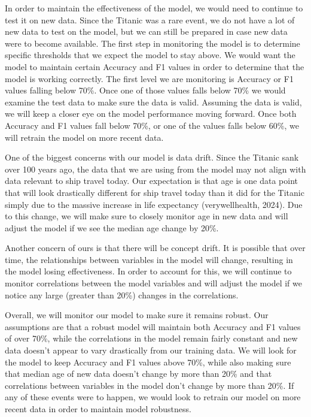 \documentclass[
  letterpaper,
  DIV=11,
  numbers=noendperiod]{scrartcl}
\begin{document}
In order to maintain the effectiveness of the model, we would need to
continue to test it on new data. Since the Titanic was a rare event, we
do not have a lot of new data to test on the model, but we can still be
prepared in case new data were to become available. The first step in
monitoring the model is to determine specific thresholds that we expect
the model to stay above. We would want the model to maintain certain
Accuracy and F1 values in order to determine that the model is working
correctly. The first level we are monitoring is Accuracy or F1 values
falling below 70\%. Once one of those values falls below 70\% we would
examine the test data to make sure the data is valid. Assuming the data
is valid, we will keep a closer eye on the model performance moving
forward. Once both Accuracy and F1 values fall below 70\%, or one of the
values falls below 60\%, we will retrain the model on more recent data.

One of the biggest concerns with our model is data drift. Since the
Titanic sank over 100 years ago, the data that we are using from the
model may not align with data relevant to ship travel today. Our
expectation is that age is one data point that will look drastically
different for ship travel today than it did for the Titanic simply due
to the massive increase in life expectancy (verywellhealth, 2024). Due
to this change, we will make sure to closely monitor age in new data and
will adjust the model if we see the median age change by 20\%.

Another concern of ours is that there will be concept drift. It is
possible that over time, the relationships between variables in the
model will change, resulting in the model losing effectiveness. In order
to account for this, we will continue to monitor correlations between
the model variables and will adjust the model if we notice any large
(greater than 20\%) changes in the correlations.

Overall, we will monitor our model to make sure it remains robust. Our
assumptions are that a robust model will maintain both Accuracy and F1
values of over 70\%, while the correlations in the model remain fairly
constant and new data doesn't appear to vary drastically from our
training data. We will look for the model to keep Accuracy and F1 values
above 70\%, while also making sure that median age of new data doesn't
change by more than 20\% and that correlations between variables in the
model don't change by more than 20\%. If any of these events were to
happen, we would look to retrain our model on more recent data in order
to maintain model robustness.
\end{document}
